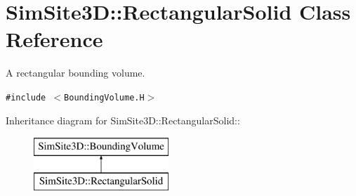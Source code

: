 \section{SimSite3D::Rectangular\-Solid Class Reference}
\label{classSimSite3D_1_1RectangularSolid}
A rectangular bounding volume.  


{\tt \#include $<$Bounding\-Volume.H$>$}

Inheritance diagram for SimSite3D::Rectangular\-Solid::\begin{figure}[H]
\begin{center}
\leavevmode
\includegraphics[height=2cm]{classSimSite3D_1_1RectangularSolid}
\end{center}
\end{figure}
